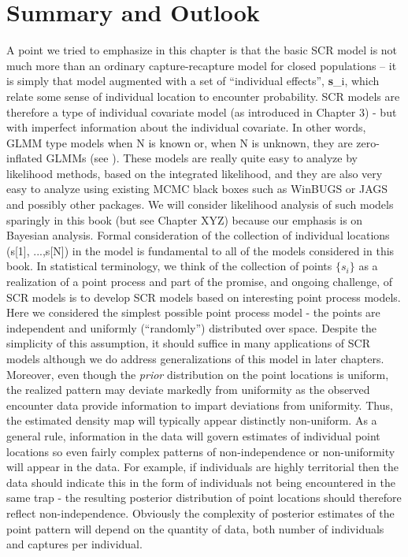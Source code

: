 \section{ Summary and Outlook  }
A point we tried to emphasize in this chapter is that the basic SCR
model is not much more than an ordinary capture-recapture model for
closed populations -- it is simply that model augmented with a set of
``individual effects'', {\bf s}_{i}, which relate some sense of individual
location to encounter probability. SCR models are therefore a type of
individual covariate model (as introduced in Chapter 3) - but with
imperfect information about the individual covariate. In other words,
GLMM type models when N is known or, when N is unknown, they are
zero-inflated GLMMs (see \citet{royle:2006}).  These models are really quite easy to analyze by likelihood methods, based on the integrated likelihood, and they are also very easy to analyze using existing MCMC black boxes such as WinBUGS or JAGS and possibly other packages.  We will consider likelihood analysis of such models sparingly in this book (but see Chapter XYZ) because our emphasis is on Bayesian analysis. 
Formal consideration of the collection of individual locations (s[1], ...,s[N]) in the model is fundamental to all of the models considered in this book. In statistical terminology, we think of the collection of points $\{ s_{i} \}$ as a realization of a point process and part of the promise, and ongoing challenge, of SCR models is to develop SCR models based on interesting point process models. Here we considered the simplest possible point process model - the points are independent and uniformly (``randomly'') distributed over space. Despite the simplicity of this assumption, it should suffice in many applications of SCR models although we do address generalizations of this model in later chapters. Moreover, even though the {\it prior} distribution on the point locations is uniform, the realized pattern may deviate markedly from uniformity as the observed encounter data provide information to impart deviations from uniformity. Thus, the estimated density map will typically appear distinctly non-uniform.  As a general rule, information in the data will govern estimates of individual point locations so even fairly complex patterns of non-independence or non-uniformity will appear in the data. For example, if individuals are highly territorial then the data should indicate this in the form of individuals not being encountered in the same trap - the resulting posterior distribution of point locations should therefore reflect non-independence.  Obviously the complexity of posterior estimates of the point pattern will depend on the quantity of data, both number of individuals and captures per individual.
